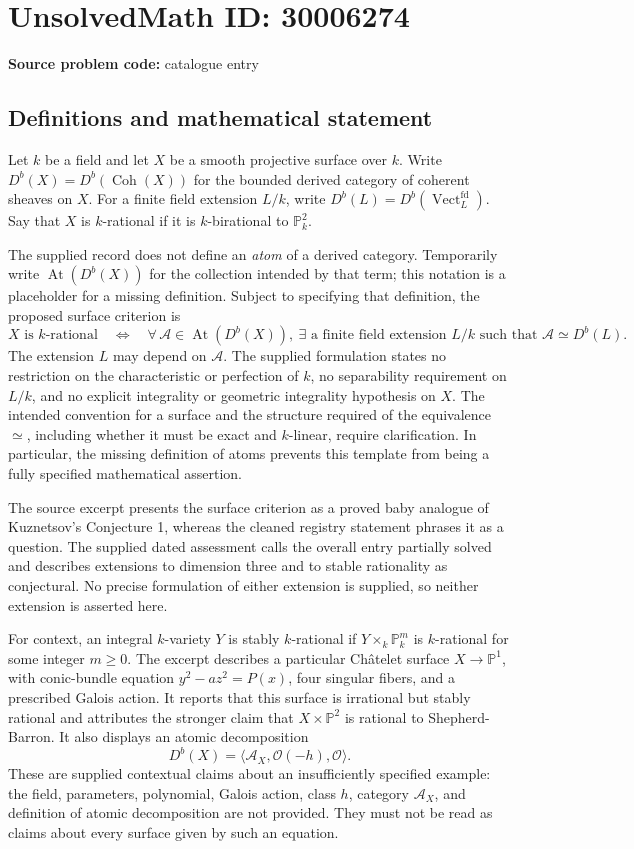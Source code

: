 \documentclass[11pt]{article}
\begin{document}
\section*{UnsolvedMath ID: 30006274}
\textbf{Source problem code:} catalogue entry
\subsection{Definitions and mathematical statement}
Let \(k\) be a field and let \(X\) be a smooth projective surface over \(k\). Write \(D^b(X)=D^b(\operatorname{Coh}(X))\) for the bounded derived category of coherent sheaves on \(X\). For a finite field extension \(L/k\), write \(D^b(L)=D^b(\operatorname{Vect}^{\mathrm{fd}}_L)\). Say that \(X\) is \(k\)-rational if it is \(k\)-birational to \(\mathbb P^2_k\).

The supplied record does not define an \emph{atom} of a derived category. Temporarily write \(\operatorname{At}(D^b(X))\) for the collection intended by that term; this notation is a placeholder for a missing definition. Subject to specifying that definition, the proposed surface criterion is
\[
X\text{ is }k\text{-rational}
\quad\Longleftrightarrow\quad
\forall\,\mathcal A\in\operatorname{At}(D^b(X)),\ \exists\text{ a finite field extension }L/k
\text{ such that }\mathcal A\simeq D^b(L).
\]
The extension \(L\) may depend on \(\mathcal A\). The supplied formulation states no restriction on the characteristic or perfection of \(k\), no separability requirement on \(L/k\), and no explicit integrality or geometric integrality hypothesis on \(X\). The intended convention for a surface and the structure required of the equivalence \(\simeq\), including whether it must be exact and \(k\)-linear, require clarification. In particular, the missing definition of atoms prevents this template from being a fully specified mathematical assertion.

The source excerpt presents the surface criterion as a proved baby analogue of Kuznetsov's Conjecture 1, whereas the cleaned registry statement phrases it as a question. The supplied dated assessment calls the overall entry partially solved and describes extensions to dimension three and to stable rationality as conjectural. No precise formulation of either extension is supplied, so neither extension is asserted here.

For context, an integral \(k\)-variety \(Y\) is stably \(k\)-rational if \(Y\times_k\mathbb P^m_k\) is \(k\)-rational for some integer \(m\geq0\). The excerpt describes a particular Ch\^atelet surface \(X\to\mathbb P^1\), with conic-bundle equation \(y^2-az^2=P(x)\), four singular fibers, and a prescribed Galois action. It reports that this surface is irrational but stably rational and attributes the stronger claim that \(X\times\mathbb P^2\) is rational to Shepherd-Barron. It also displays an atomic decomposition
\[
D^b(X)=\langle\mathcal A_X,\mathcal O(-h),\mathcal O\rangle.
\]
These are supplied contextual claims about an insufficiently specified example: the field, parameters, polynomial, Galois action, class \(h\), category \(\mathcal A_X\), and definition of atomic decomposition are not provided. They must not be read as claims about every surface given by such an equation.
\end{document}
